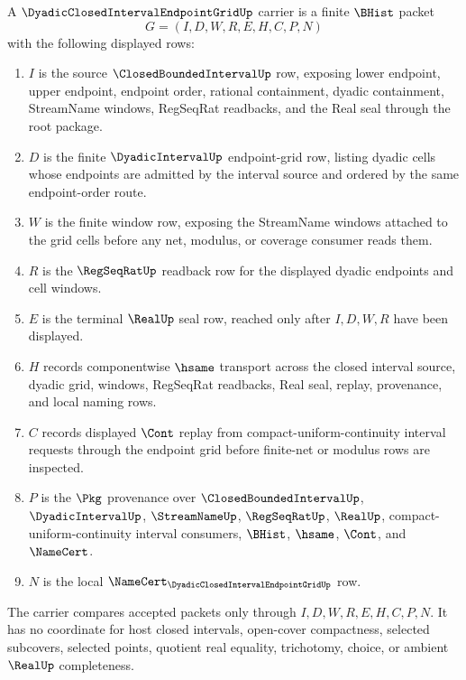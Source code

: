 \begin{definition}
\label{def:dyadic-closed-interval-endpoint-grid-carrier}
A $\DyadicClosedIntervalEndpointGridUp$ carrier is a finite $\BHist$ packet
$$
G=(I,D,W,R,E,H,C,P,N)
$$
with the following displayed rows:
\begin{enumerate}
\item $I$ is the source $\ClosedBoundedIntervalUp$ row, exposing lower endpoint, upper endpoint, endpoint order, rational containment, dyadic containment, StreamName windows, RegSeqRat readbacks, and the Real seal through the root package.
\item $D$ is the finite $\DyadicIntervalUp$ endpoint-grid row, listing dyadic cells whose endpoints are admitted by the interval source and ordered by the same endpoint-order route.
\item $W$ is the finite window row, exposing the StreamName windows attached to the grid cells before any net, modulus, or coverage consumer reads them.
\item $R$ is the $\RegSeqRatUp$ readback row for the displayed dyadic endpoints and cell windows.
\item $E$ is the terminal $\RealUp$ seal row, reached only after $I,D,W,R$ have been displayed.
\item $H$ records componentwise $\hsame$ transport across the closed interval source, dyadic grid, windows, RegSeqRat readbacks, Real seal, replay, provenance, and local naming rows.
\item $C$ records displayed $\Cont$ replay from compact-uniform-continuity interval requests through the endpoint grid before finite-net or modulus rows are inspected.
\item $P$ is the $\Pkg$ provenance over $\ClosedBoundedIntervalUp$, $\DyadicIntervalUp$, $\StreamNameUp$, $\RegSeqRatUp$, $\RealUp$, compact-uniform-continuity interval consumers, $\BHist$, $\hsame$, $\Cont$, and $\NameCert$.
\item $N$ is the local $\NameCert_{\DyadicClosedIntervalEndpointGridUp}$ row.
\end{enumerate}
The carrier compares accepted packets only through $I,D,W,R,E,H,C,P,N$. It has no coordinate for host closed intervals, open-cover compactness, selected subcovers, selected points, quotient real equality, trichotomy, choice, or ambient $\RealUp$ completeness.
\end{definition}

